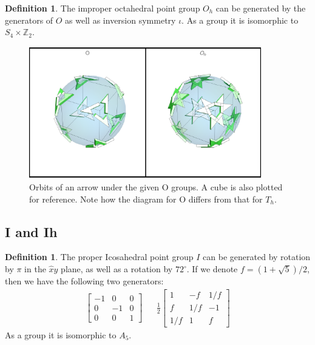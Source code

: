 \documentclass[12pt, letterpaper]{article}
\theoremstyle{definition} %
\newtheorem{defn}[thm]{Definition} %
\begin{document}
\begin{defn}
  The improper octahedral point group $O_h$ can be generated by the generators of $O$ as well as inversion symmetry $\iota$. 
  As a group it is isomorphic to $S_4\times \mathbb{Z}_2$.
\end{defn}

\begin{figure}[H]
\centering
\includegraphics[width=0.9\textwidth]{figureO}
\caption{Orbits of an arrow under the given O groups. A cube is also plotted for reference. Note how
the diagram for O differs from that for $T_h$.}

\label{figure-o}
\end{figure}
\subsection{I and Ih}

\begin{defn}
  The proper Icosahedral point group $I$ can be generated by rotation by $\pi$ in the $\hat{x}\hat{y}$ plane, as well as a 
  rotation by $72^\circ$. If we denote $f=(1+\sqrt{5})/2$, then we have the following two generators:
  \begin{align*}
    \begin{bmatrix}
       -1 & 0 & 0 \\ 0 & -1 & 0 \\ 0 & 0 & 1
    \end{bmatrix} & &  
    \frac{1}{2}
    \begin{bmatrix}
      1 & -f & 1/f \\ f & 1/f & -1 \\ 1/f & 1 & f
    \end{bmatrix} 
  \end{align*}
  As a group it is isomorphic to $A_5$.
\end{defn}
\end{document}
